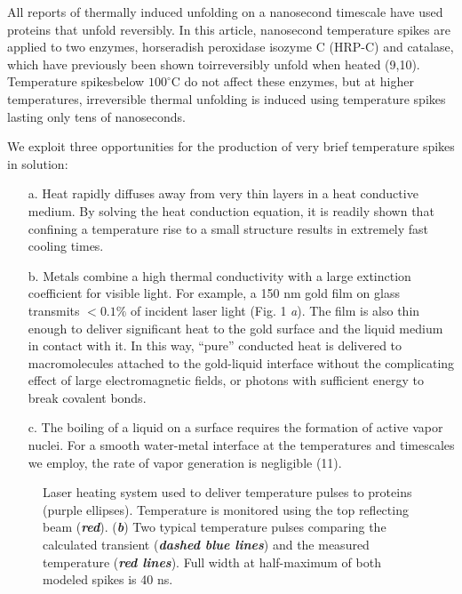 \documentclass{biophys_letter}
\begin{document}
\begin{multicols}{2}
All reports of thermally induced unfolding on a nanosecond timescale have used proteins that unfold reversibly. In this article, nanosecond temperature spikes are applied to two enzymes, horseradish peroxidase isozyme C (HRP-C) and catalase, which have previously been shown to\break irreversibly unfold when heated (9,10). Temperature spikes\break below $100^\circ$C do not affect these enzymes, but at higher temperatures, irreversible thermal unfolding is induced using temperature spikes lasting only tens of nanoseconds.

We exploit three opportunities for the production of very brief temperature spikes in solution:
\begin{itemize}
\item[a.] Heat rapidly diffuses away from very thin layers in a heat conductive medium. By solving the heat conduction equation, it is readily shown that confining a temperature rise to a small structure results in extremely fast cooling times.

\item[b.] Metals combine a high thermal conductivity with a large extinction coefficient for visible light. For example, a 150 nm gold film on glass transmits $<0.1\%$ of incident laser light (Fig. 1 {\it a}). The film is also thin enough to deliver significant heat to the gold surface and the liquid medium in contact with it. In this way, ``pure'' conducted heat is delivered to macromolecules attached to the gold-liquid interface without the complicating effect of large electromagnetic fields, or photons with sufficient energy to break covalent bonds.
\end{itemize}
\doiline
\end{multicols}

\twocolumn
\begin{itemize}
\item[c.] The boiling of a liquid on a surface requires the formation of active vapor nuclei. For a smooth water-metal interface at the temperatures and timescales we employ, the rate of vapor generation is negligible (11).
\end{itemize}
\begin{figure}[t!]\vspace*{3pt}
\caption{Laser heating system used to deliver temperature pulses to proteins (purple ellipses). Temperature is monitored using the top reflecting beam ({\bfseries\itshape red}). ({\bfseries\itshape b}) Two typical temperature pulses comparing the calculated transient ({\bfseries\itshape dashed blue lines}) and the measured temperature ({\bfseries\itshape red lines}). Full width at half-maximum  of both modeled spikes is 40 ns.}\vspace*{-8pt}
\end{figure}
\end{document}
